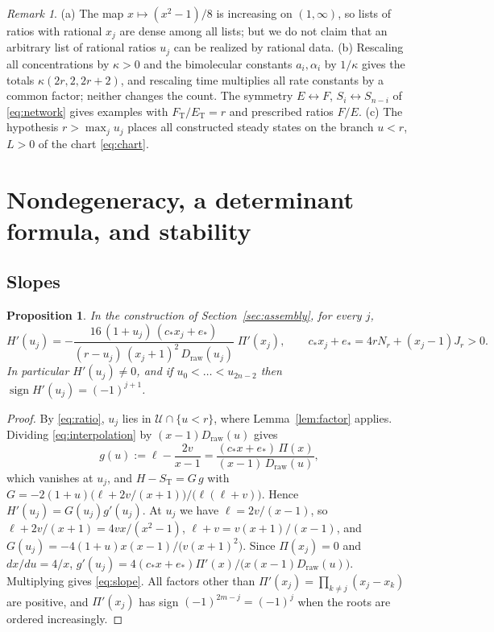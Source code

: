 \documentclass[11pt]{article}
\theoremstyle{plain}
\newtheorem{proposition}[theorem]{Proposition}
\theoremstyle{definition}
\theoremstyle{remark}
\newtheorem{remark}[theorem]{Remark}
\numberwithin{equation}{section}
\newcommand{\raw}{\mathrm{raw}}
\newcommand{\ET}{E_{\mathrm T}}
\newcommand{\FT}{F_{\mathrm T}}
\newcommand{\ST}{S_{\mathrm T}}
\newcommand{\cs}{c_\ast}
\newcommand{\es}{e_\ast}
\DeclareMathOperator{\sign}{sign}
\begin{document}
\begin{remark}
(a) The map \(x\mapsto(x^2-1)/8\) is increasing on \((1,\infty)\), so lists of ratios with
rational \(x_j\) are dense among all lists; but we do not claim that an arbitrary list of
rational ratios \(u_j\) can be realized by rational data.
(b) Rescaling all concentrations by \(\kappa>0\) and the bimolecular constants
\(a_i,\alpha_i\) by \(1/\kappa\) gives the totals \(\kappa(2r,2,2r+2)\), and rescaling time
multiplies all rate constants by a common factor; neither changes the count. The symmetry
\(E\leftrightarrow F\), \(S_i\leftrightarrow S_{n-i}\) of \eqref{eq:network} gives examples
with \(\FT/\ET=r\) and prescribed ratios \(F/E\).
(c) The hypothesis \(r>\max_ju_j\) places all constructed steady states on the branch
\(u<r\), \(L>0\) of the chart \eqref{eq:chart}.
\end{remark}

\section{Nondegeneracy, a determinant formula, and stability}\label{sec:nondeg}

\subsection{Slopes}
\begin{proposition}\label{prop:slope}
In the construction of Section~\ref{sec:assembly}, for every \(j\),
\begin{equation}\label{eq:slope}
 H'(u_j)=-\frac{16\,(1+u_j)\,(\cs x_j+\es)}{(r-u_j)\,(x_j+1)^2\,D_{\raw}(u_j)}\;\Pi'(x_j),
 \qquad \cs x_j+\es=4rN_r+(x_j-1)J_r>0 .
\end{equation}
In particular \(H'(u_j)\ne0\), and if \(u_0<\dots<u_{2n-2}\) then
\(\sign H'(u_j)=(-1)^{j+1}\).
\end{proposition}
\begin{proof}
By \eqref{eq:ratio}, \(u_j\) lies in \(\mathcal U\cap\{u<r\}\), where
Lemma~\ref{lem:factor} applies. Dividing \eqref{eq:interpolation} by \((x-1)D_{\raw}(u)\)
gives
\[
 g(u):=\ell-\frac{2v}{x-1}=\frac{(\cs x+\es)\,\Pi(x)}{(x-1)\,D_{\raw}(u)},
\]
which vanishes at \(u_j\), and \(H-\ST=G\,g\) with
\(G=-2(1+u)\bigl(\ell+2v/(x+1)\bigr)/\bigl(\ell(\ell+v)\bigr)\). Hence
\(H'(u_j)=G(u_j)g'(u_j)\). At \(u_j\) we have \(\ell=2v/(x-1)\), so
\(\ell+2v/(x+1)=4vx/(x^2-1)\), \(\ell+v=v(x+1)/(x-1)\), and
\(G(u_j)=-4(1+u)x(x-1)/\bigl(v(x+1)^2\bigr)\). Since \(\Pi(x_j)=0\) and \(dx/du=4/x\),
\(g'(u_j)=4(\cs x+\es)\Pi'(x)/\bigl(x(x-1)D_{\raw}(u)\bigr)\). Multiplying gives
\eqref{eq:slope}. All factors other than \(\Pi'(x_j)=\prod_{k\ne j}(x_j-x_k)\) are positive,
and \(\Pi'(x_j)\) has sign \((-1)^{2m-j}=(-1)^j\) when the roots are ordered increasingly.
\end{proof}
\end{document}
